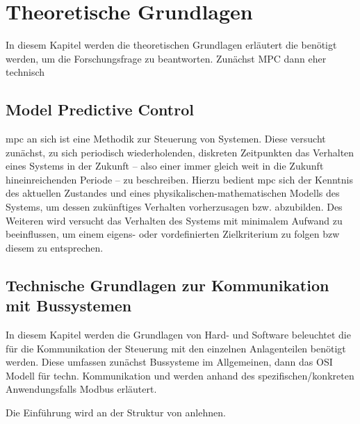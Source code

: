 \renewcommand{\chapterheadstartvskip}{\vspace*{2cm}}

\chapter{Theoretische Grundlagen}
\label{chap:theoretischegrundlagen}

In diesem Kapitel werden die theoretischen Grundlagen erläutert die benötigt werden, um die Forschungsfrage zu beantworten.
Zunächst MPC dann eher technisch

\section{Model Predictive Control}
\label{chap:mpc}


\acrlong{mpc} an sich ist eine Methodik zur Steuerung von Systemen. Diese versucht zunächst, zu sich periodisch wiederholenden, diskreten Zeitpunkten das Verhalten eines Systems in der Zukunft -- also einer immer gleich weit in die Zukunft hineinreichenden Periode -- zu beschreiben. Hierzu bedient \acrlong{mpc} sich der Kenntnis des aktuellen Zustandes und eines physikalischen-mathematischen Modells des Systems, um dessen zukünftiges Verhalten \Gun vorherzusagen \Gob bzw. abzubilden. Des Weiteren wird versucht das Verhalten des Systems mit minimalem Aufwand zu beeinflussen, um einem eigens- oder vordefinierten Zielkriterium zu folgen \acrlong{bzw} diesem zu entsprechen.




\section{Technische Grundlagen zur Kommunikation mit Bussystemen}
\label{sec:grundlagenbus}
In diesem Kapitel werden die Grundlagen von Hard- und Software beleuchtet die für die Kommunikation der Steuerung mit den einzelnen Anlagenteilen benötigt werden.
Diese umfassen zunächst Bussysteme im Allgemeinen, dann das OSI Modell für techn. Kommunikation und werden anhand des spezifischen/konkreten Anwendungsfalls Modbus erläutert.

Die Einführung wird an der Struktur von \cite{schn06} anlehnen.

